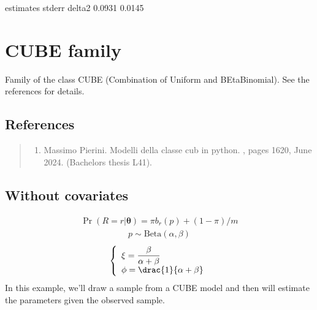\documentclass[letterpaper,10pt,english]{sphinxmanual}
\begin{document}
\noindent{}

\begin{sphinxVerbatim}[commandchars=\\\{\}]
     estimates  stderr
delta2  0.0931  0.0145
\end{sphinxVerbatim}


\section{CUBE family}
\label{\detokenize{manual:cube-family}}
\sphinxAtStartPar
Family of the class CUBE (Combination of Uniform and BEtaBinomial).
See the references for details.


\subsection{References}
\label{\detokenize{manual:id158}}\begin{quote}
\begin{enumerate}
%
\setcounter{enumi}{0}
\item {} 
\sphinxAtStartPar
Massimo Pierini. Modelli della classe cub in python. , pages 16\textendash{}20, June 2024. (Bachelor\textquotesingle{}s thesis L\sphinxhyphen{}41).

\end{enumerate}
\end{quote}


\subsection{Without covariates}
\label{\detokenize{manual:id196}}\begin{equation*}
\begin{split}\Pr(R=r|\pmb\theta) = \pi b_r(p) + (1-\pi)/m\end{split}
\end{equation*}\begin{equation*}
\begin{split}p \sim \mathrm{Beta}(\alpha,\beta)\end{split}
\end{equation*}\begin{equation*}
\begin{split}\left\{
\begin{array}{l}
    \xi = \dfrac{\beta}{\alpha+\beta}
    \\
    \phi = \drac{1}{\alpha+\beta}
\end{array}
\right.\end{split}
\end{equation*}
\sphinxAtStartPar
In this example, we’ll draw a sample from a CUBE model and then
will estimate the parameters given the observed sample.
\end{document}
